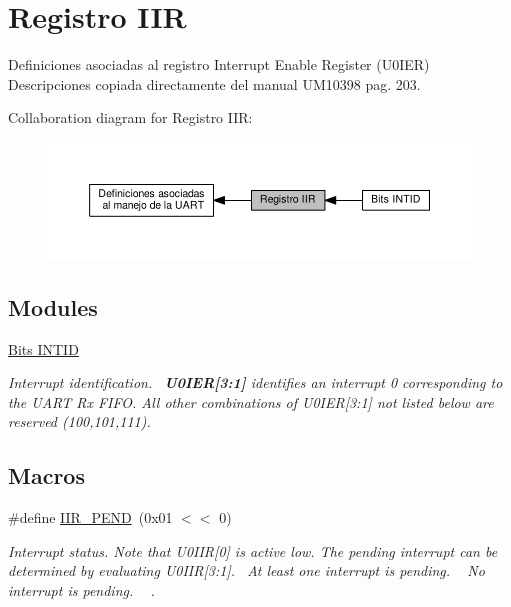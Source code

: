 \hypertarget{group___r_e_g_i_s_t_r_o___i_i_r}{}\section{Registro I\+IR}
\label{group___r_e_g_i_s_t_r_o___i_i_r}


Definiciones asociadas al registro Interrupt Enable Register (U0\+I\+ER)~\newline
 Descripciones copiada directamente del manual U\+M10398 pag. 203.  


Collaboration diagram for Registro I\+IR\+:\nopagebreak
\begin{figure}[H]
\begin{center}
\leavevmode
\includegraphics[width=350pt]{group___r_e_g_i_s_t_r_o___i_i_r}
\end{center}
\end{figure}
\subsection*{Modules}
\begin{DoxyCompactItemize}
\item 
\hyperlink{group___i_n_t_i_d}{Bits I\+N\+T\+ID}
\begin{DoxyCompactList}\small\item\em Interrupt identification.~\newline
 {\bfseries  U0\+I\+ER\mbox{[}3\+:1\mbox{]} } identifies an interrupt 0 corresponding to the U\+A\+RT Rx F\+I\+FO. All other combinations of U0\+I\+ER\mbox{[}3\+:1\mbox{]} not listed below are reserved (100,101,111). \end{DoxyCompactList}\end{DoxyCompactItemize}
\subsection*{Macros}
\begin{DoxyCompactItemize}
\item 
\#define \hyperlink{group___r_e_g_i_s_t_r_o___i_i_r_gaceec69c2af58ca0d5bc80828b2a58964}{I\+I\+R\+\_\+\+P\+E\+ND}~(0x01 $<$$<$ 0)
\begin{DoxyCompactList}\small\item\em Interrupt status. Note that U0\+I\+IR\mbox{[}0\mbox{]} is active low. The pending interrupt can be determined by evaluating U0\+I\+IR\mbox{[}3\+:1\mbox{]}.~ At least one interrupt is pending. ~ No interrupt is pending. ~\newline
. \end{DoxyCompactList}\end{DoxyCompactItemize}


